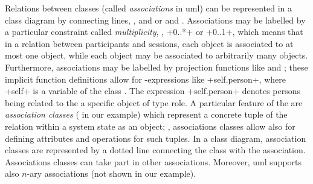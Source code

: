Relations between classes (called \emph{associations} in \acs{uml})
can be represented in a class diagram by connecting lines, \eg,
 and  or 
and . Associations may be labelled by a particular
constraint called \emph{multiplicity}, \eg, \inlineocl+0..*+ or
\inlineocl+0..1+, which means that in a relation between participants
and sessions, each  object is associated to at
most one  object, while each 
object may be associated to arbitrarily many 
objects. Furthermore, associations may be labelled by projection
functions like  and ; these implicit
function definitions allow for \OCL-expressions like
\inlineocl+self.person+, where \inlineocl+self+ is a variable of the
class . The expression \inlineocl+self.person+ denotes
persons being related to the a specific object  of
type role. A particular feature of the \UML are \emph{association
  classes} ( in our example) which represent a
concrete tuple of the relation within a system state as an object;
\ie, associations classes allow also for defining attributes and
operations for such tuples. In a class diagram, association classes
are represented by a dotted line connecting the class with the
association. Associations classes can take part in other associations.
Moreover, \acs{uml} supports also $n$-ary associations (not shown in
our example).

